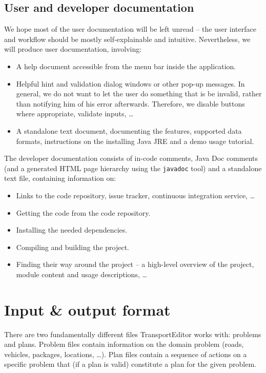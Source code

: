 \documentclass[10pt,a4paper,oneside]{article}
\newcommand{\pname}{TransportEditor} %
\begin{document}
\subsection{User and developer documentation} \label{docs}

We hope most of the user documentation will be left unread -- the user interface and workflow should be
mostly self-explainable and intuitive.
Nevertheless, we will produce user documentation, involving:
\begin{itemize}
\item A help document accessible from the menu bar inside the application.
\item Helpful hint and validation dialog windows or other pop-up messages. In general, we do not want to let the user do something that is be invalid, rather than notifying him of his error afterwards. Therefore, we disable buttons where appropriate, validate inputs, \ldots
\item A standalone text document, documenting the features, supported data formats, instructions on the installing Java JRE and a demo usage tutorial.
\end{itemize}

The developer documentation consists of in-code comments, Java Doc comments (and a generated HTML page hierarchy using the \verb+javadoc+ tool) and a standalone text file, containing information on:
\begin{itemize}
\item Links to the code repository, issue tracker, continuous integration service, \ldots
\item Getting the code from the code repository.
\item Installing the needed dependencies.
\item Compiling and building the project.
\item Finding their way around the project -- a high-level overview of the project, module content and usage descriptions, \ldots
\end{itemize}






\section{Input \& output format} \label{input-output}

There are two fundamentally different files \pname{} works with: problems and plans.
Problem files contain information on the domain problem (roads, vehicles, packages, locations, \ldots).
Plan files contain a sequence of actions on a specific problem that (if a plan is valid) constitute a plan
for the given problem.
\end{document}
